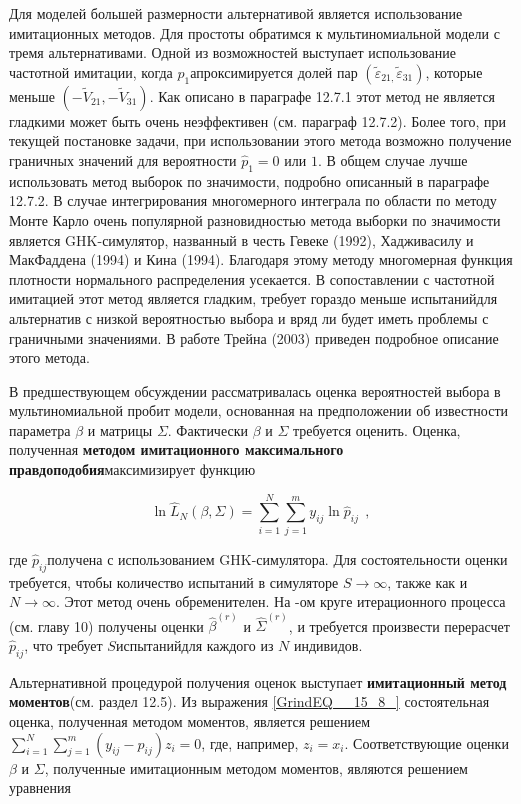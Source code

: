 Для моделей большей размерности альтернативой является использование имитационных методов. Для простоты обратимся к мультиномиальной модели с тремя альтернативами. Одной из возможностей выступает использование частотной имитации, когда $p_1$апроксимируется долей пар $\left({\widetilde{\varepsilon }}_{21,}{\widetilde{\varepsilon }}_{31}\right)$, которые меньше $(-{\tilde{V}}_{21},-{\tilde{V}}_{31})$. Как описано в параграфе 12.7.1 этот метод не является гладкими может быть очень неэффективен (см. параграф 12.7.2). Более того, при текущей постановке задачи, при использовании этого метода возможно получение граничных значений для вероятности ${\hat{p}}_1=0\text{ или } 1$. В общем случае лучше использовать метод выборок по значимости, подробно описанный в параграфе 12.7.2. В случае интегрирования многомерного интеграла по области по методу Монте Карло очень популярной разновидностью метода выборки по значимости является GHK-симулятор, названный в честь Гевеке (1992), Хадживасилу и МакФаддена (1994) и Кина (1994). Благодаря этому методу многомерная функция плотности нормального распределения усекается. В сопоставлении с частотной имитацией этот метод является гладким, требует гораздо меньше испытанийдля альтернатив с низкой вероятностью выбора и вряд ли будет иметь проблемы с граничными значениями. В работе Трейна (2003) приведен подробное описание этого метода.

В предшествующем обсуждении рассматривалась оценка вероятностей выбора в мультиномиальной пробит модели, основанная на предположении об известности параметра $\beta $ и матрицы $\Sigma $. Фактически $\beta $ и $\Sigma $ требуется оценить. Оценка, полученная \textbf{методом имитационного максимального правдоподобия}максимизирует функцию

\[{\ln  {\hat{L}}_N(\beta ,\Sigma )=\sum^N_{i=1}{\sum^m_{j=1}{y_{ij}{\ln  {\hat{p}}_{ij}\ }}}\ },\] 

где ${\hat{p}}_{ij}$получена с использованием GHK-симулятора. Для состоятельности оценки требуется, чтобы количество испытаний в симуляторе $S\to \infty $, также как и $N\to \infty $. Этот метод очень обременителен. На -ом круге итерационного процесса (см. главу 10) получены оценки ${\widehat{\beta }}^{(r)}$ и ${\widehat{\Sigma }}^{(r)}$, и требуется произвести перерасчет ${\hat{p}}_{ij}$, что требует $S$испытанийдля каждого из $N$ индивидов.

Альтернативной процедурой получения оценок выступает \textbf{имитационный метод моментов}(см. раздел 12.5). Из выражения \eqref{GrindEQ__15_8_} состоятельная оценка, полученная методом моментов, является решением $\sum^N_{i=1}{\sum^m_{j=1}{\left(y_{ij}-p_{ij}\right)z_i=0}}$, где, например, $z_i=x_i$. Соответствующие оценки $\beta $ и $\Sigma $, полученные имитационным методом моментов, являются решением уравнения

